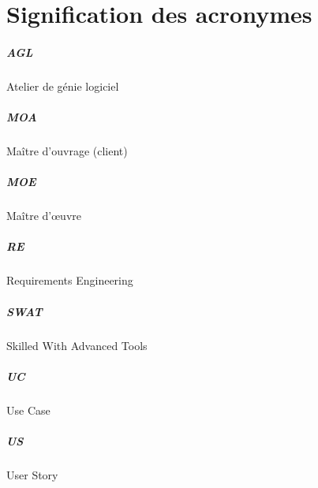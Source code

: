 \documentclass[12pt,a4paper,openany,oneside]{book}
\newcommand{\nouveauChapitre}{ \thispagestyle{fancy} }
\begin{document}
	\maketitle
	\frontmatter
	\setcounter{tocdepth}{1}
	\setcounter{secnumdepth}{3}
	
	\tableofcontents
	\nouveauChapitre
	\mainmatter
	
	
	\appendix
	\chapter{Signification des acronymes}
	\paragraph{AGL} Atelier de génie logiciel
	\paragraph{MOA} Maître d'ouvrage (client)
	\paragraph{MOE} Maître d'\oe{}uvre 
	\paragraph{RE} Requirements Engineering
	\paragraph{SWAT} Skilled With Advanced Tools
	\paragraph{UC} Use Case
	\paragraph{US} User Story
\end{document}
